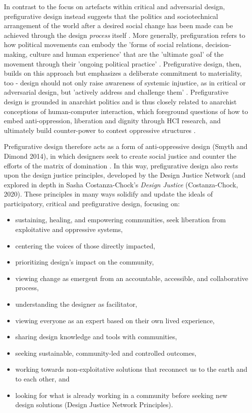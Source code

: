 In contrast to the focus on artefacts within critical and adversarial design, prefigurative design instead suggests that the politics and sociotechnical arrangement of the world after a desired social change has been made can be achieved through the design \textit{process} itself \cite{asad_creating_2017}. More generally, prefiguration refers to how political movements can embody the 'forms of social relations, decision-making, culture and human experience' that are the 'ultimate goal' of the movement through their 'ongoing political practice' \cite{boggs_marxism_1977, 7}. Prefigurative design, then, builds on this approach but emphasizes a deliberate commitment to materiality, too - design should not only raise awareness of systemic injustice, as in critical or adversarial design, but 'actively address and challenge them' \cite{asad_prefigurative_2018}. Prefigurative design is grounded in anarchist politics and is thus closely related to anarchist conceptions of human-computer interaction, which foreground questions of how to embed anti-oppression, liberation and dignity through HCI research, and ultimately build counter-power to contest oppressive structures \cite{keyes_human-computer_2019,asad_prefigurative_2019}. 

Prefigurative design therefore acts as a form of anti-oppressive design (Smyth and Dimond 2014), in which designers seek to create social justice and counter the efforts of the matrix of domination \cite{collins_black_2002}. In this way, prefigurative design also rests upon the design justice principles, developed by the Design Justice Network (and explored in depth in Sasha Costanza-Chock's \textit{Design Justice} (Costanza-Chock, 2020). These principles in many ways solidify and update the ideals of participatory, critical and prefigurative design, focusing on: 
\begin{itemize}
\item sustaining, healing, and empowering communities, seek liberation from exploitative and oppressive systems,
\item centering the voices of those directly impacted,
\item prioritizing design's impact on the community,
\item viewing change as emergent from an accountable, accessible, and collaborative process,
\item understanding the designer as facilitator,
\item viewing everyone as an expert based on their own lived experience,
\item sharing design knowledge and tools with communities,
\item seeking sustainable, community-led and controlled outcomes,
\item working towards non-exploitative solutions that reconnect us to the earth and to each other, and
\item looking for what is already working in a community before seeking new design solutions (Design Justice Network Principles).
\end{itemize}


